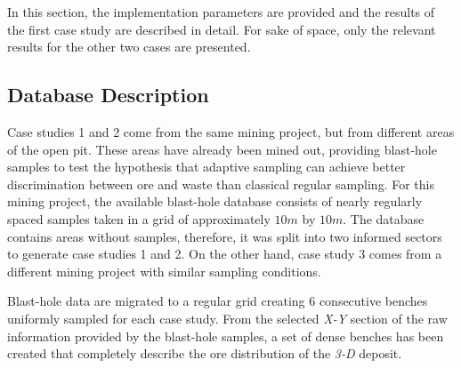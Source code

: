 In this section, the implementation parameters are provided and the results of the first case study are described in detail. For sake of space, only the relevant results for the other two cases are presented.

\subsection{Database Description}
\label{subs_dataDescription}

Case studies 1 and 2 come from the same mining project, but from different areas of the open pit. These areas have already been mined out, providing blast-hole samples to test the hypothesis that adaptive sampling can achieve better discrimination between ore and waste than classical regular sampling. For this mining project, the available blast-hole database consists of nearly regularly spaced samples taken in a grid of approximately $10m$ by $10m$. The database contains areas without samples, therefore, it was split into two informed sectors to generate case studies 1 and 2. On the other hand, case study 3 comes from a different mining project with similar sampling conditions. 

Blast-hole data are migrated to a regular grid creating 6 consecutive benches uniformly sampled for each case study. From the selected \emph{X-Y} section of the raw information provided by the blast-hole samples, a set of dense benches has been created that completely describe the ore distribution of the \emph{3-D} deposit.

